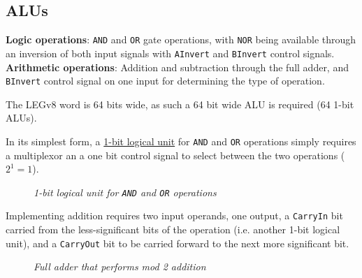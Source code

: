 \documentclass[11pt]{article}
\begin{document}
\subsection*{ALUs}

\begin{tcolorbox}[
    enhanced,
    attach boxed title to top left={xshift=6mm,yshift=-1.5mm},
    colback=moonstoneblue!20,
    colframe=moonstoneblue,
    colbacktitle=moonstoneblue,
    title=Operation done by the ALU,
    fonttitle=\bfseries\color{white},
    boxed title style={size=small,colframe=moonstoneblue,sharp corners},
    sharp corners,
]
    {\color{moondark}\textbf{Logic operations}}: \texttt{AND} and \texttt{OR} gate operations, with \texttt{NOR} being available through an inversion of both input signals with \texttt{AInvert} and \texttt{BInvert} control signals. \\
    {\color{moondark}\textbf{Arithmetic operations}}: Addition and subtraction through the full adder, and \texttt{BInvert} control signal on one input for determining the type of operation.
\end{tcolorbox}

The LEGv8 word is 64 bits wide, as such a 64 bit wide ALU is required (64 1-bit ALUs).

In its simplest form, a \underline{1-bit logical unit} for \texttt{AND} and \texttt{OR} operations simply requires a multiplexor an a one bit control signal to select between the two operations ($2^1=1$).

\begin{figure}[htbp]
    \centering
    \caption{\textit{1-bit logical unit for \texttt{AND} and \texttt{OR} operations}}
\end{figure}

Implementing addition requires two input operands, one output, a \texttt{CarryIn} bit carried from the less-significant bits of the operation (i.e. another 1-bit logical unit), and a \texttt{CarryOut} bit to be carried forward to the next more significant bit.

\begin{figure}[htbp]
    \centering
    \caption{\textit{Full adder that performs mod 2 addition}}
\end{figure}
\end{document}
